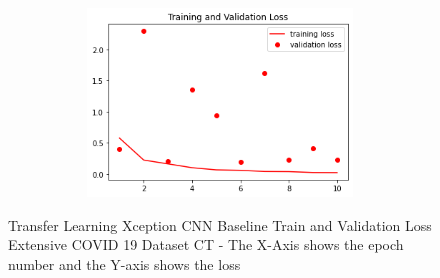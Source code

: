  \begin{figure}[H]
    \centering
    \includegraphics[width=1\textwidth,height=5cm,keepaspectratio]{Images/XceptionBaselineTrainingValidationLossExtensiveCT.png}\\
    \caption{Transfer Learning Xception CNN Baseline Train and Validation Loss Extensive COVID 19 Dataset CT - The X-Axis shows the epoch number and the Y-axis shows the loss}
    \label{fig:Xception CNN Baseline Train and Validation Loss Extensive COVID 19 Dataset CT}
\end{figure}
